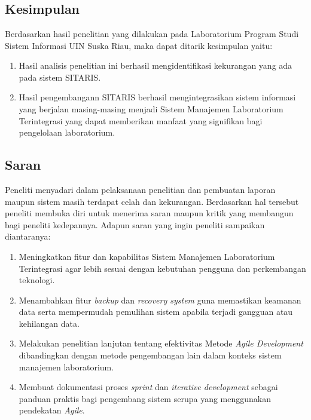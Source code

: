 %
%
%
%


\chapter{\babEnam}
\thispagestyle{fancy}
\section{Kesimpulan}
Berdasarkan hasil penelitian yang dilakukan pada Laboratorium Program Studi Sistem Informasi UIN Suska Riau, maka dapat ditarik kesimpulan yaitu:

\begin{enumerate}
	\item Hasil analisis penelitian ini berhasil mengidentifikasi kekurangan yang ada pada sistem SITARIS.
	\item Hasil pengembangann SITARIS berhasil mengintegrasikan sistem informasi yang berjalan masing-masing menjadi Sistem Manajemen Laboratorium Terintegrasi yang dapat memberikan manfaat yang signifikan bagi pengelolaan laboratorium.
\end{enumerate}

\section{Saran}
Peneliti menyadari dalam pelaksanaan penelitian dan pembuatan laporan maupun sistem masih terdapat celah dan kekurangan. Berdasarkan hal tersebut peneliti membuka diri untuk menerima saran maupun kritik yang membangun bagi peneliti kedepannya. Adapun saran yang ingin peneliti sampaikan diantaranya:

\begin{enumerate}
	\item Meningkatkan fitur dan kapabilitas Sistem Manajemen Laboratorium Terintegrasi agar lebih sesuai dengan kebutuhan pengguna dan perkembangan teknologi.
	\item Menambahkan fitur \textit{backup} dan \textit{recovery system} guna memastikan keamanan data serta mempermudah pemulihan sistem apabila terjadi gangguan atau kehilangan data.
	\item Melakukan penelitian lanjutan tentang efektivitas Metode \textit{Agile Development} dibandingkan dengan metode pengembangan lain dalam konteks sistem manajemen laboratorium.
	\item Membuat dokumentasi proses \textit{sprint} dan \textit{iterative development} sebagai panduan praktis bagi pengembang sistem serupa yang menggunakan pendekatan \textit{Agile}.
\end{enumerate}